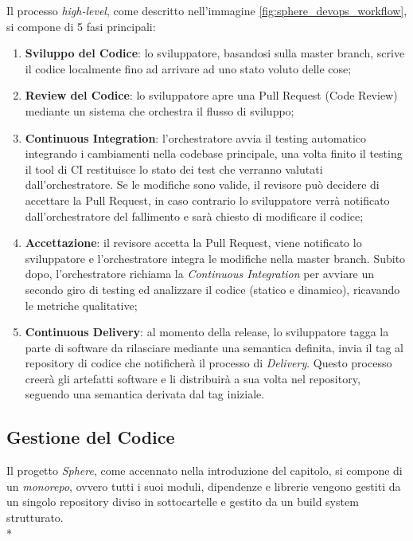 \documentclass[../main.tex]{subfiles}
\begin{document}
        	    Il processo \emph{high-level}, come descritto nell'immagine \ref{fig:sphere_devops_workflow}, si compone di 5 fasi principali:
        	    \begin{enumerate}
        	        \item \textbf{Sviluppo del Codice}: lo sviluppatore, basandosi sulla master branch, scrive il codice localmente fino ad arrivare ad uno stato voluto delle cose;
        	        \item \textbf{Review del Codice}: lo sviluppatore apre una Pull Request (Code Review) mediante un sistema che orchestra il flusso di sviluppo;
        	        \item \textbf{Continuous Integration}: l'orchestratore avvia il testing automatico integrando i cambiamenti nella codebase principale, una volta finito il testing il tool di CI restituisce lo stato dei test che verranno valutati dall'orchestratore. Se le modifiche sono valide, il revisore può decidere di accettare la Pull Request, in caso contrario lo sviluppatore verrà notificato dall'orchestratore del fallimento e sarà chiesto di modificare il codice;
        	        \item \textbf{Accettazione}: il revisore accetta la Pull Request, viene notificato lo sviluppatore e l'orchestratore integra le modifiche nella master branch. Subito dopo, l'orchestratore richiama la \emph{Continuous Integration} per avviare un secondo giro di testing ed analizzare il codice (statico e dinamico), ricavando le metriche qualitative;
        	        \item \textbf{Continuous Delivery}: al momento della release, lo sviluppatore tagga la parte di software da rilasciare mediante una semantica definita, invia il tag al repository di codice che notificherà il processo di \emph{Delivery}. Questo processo creerà gli artefatti software e li distribuirà a sua volta nel repository, seguendo una semantica derivata dal tag iniziale.
        	    \end{enumerate}

        	\subsection{Gestione del Codice}
        	
        	    Il progetto \emph{Sphere}, come accennato nella introduzione del capitolo, si compone di un \emph{monorepo}, ovvero tutti i suoi moduli, dipendenze e librerie vengono gestiti da un singolo repository diviso in sottocartelle e gestito da un build system strutturato.\\*
        	    
\end{document}
